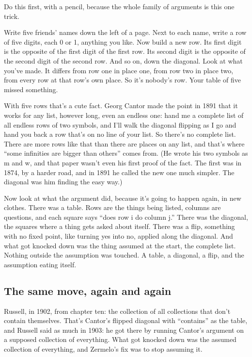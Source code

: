 \documentclass[11pt,twoside]{article}
\theoremstyle{thielethm}
\theoremstyle{thieledef}
\theoremstyle{thieledef}
\theoremstyle{thieledef}
\theoremstyle{thielethm}
\theoremstyle{thieleobs}
\theoremstyle{thielethm}
\begin{document}
Do this first, with a pencil, because the whole family of arguments is this one trick.

Write five friends' names down the left of a page. Next to each name, write a row of five digits, each 0 or 1, anything you like. Now build a new row. Its first digit is the opposite of the first digit of the first row. Its second digit is the opposite of the second digit of the second row. And so on, down the diagonal. Look at what you've made. It differs from row one in place one, from row two in place two, from every row at that row's own place. So it's nobody's row. Your table of five missed something.

With five rows that's a cute fact. Georg Cantor made the point in 1891 that it works for any list, however long, even an endless one: hand me a complete list of all endless rows of two symbols, and I'll walk the diagonal flipping as I go and hand you back a row that's on no line of your list. So there's no complete list. There are more rows like that than there are places on any list, and that's where ``some infinities are bigger than others'' comes from. (He wrote his two symbols as m and w, and that paper wasn't even his first proof of the fact. The first was in 1874, by a harder road, and in 1891 he called the new one much simpler. The diagonal was him finding the easy way.)

Now look at what the argument did, because it's going to happen again, in new clothes. There was a table. Rows are the things being listed, columns are questions, and each square says ``does row i do column j.'' There was the diagonal, the squares where a thing gets asked about itself. There was a flip, something with no fixed point, like turning yes into no, applied along the diagonal. And what got knocked down was the thing assumed at the start, the complete list. Nothing outside the assumption was touched. A table, a diagonal, a flip, and the assumption eating itself.

\subsection{The same move, again and again}

Russell, in 1902, from chapter ten: the collection of all collections that don't contain themselves. That's Cantor's flipped diagonal with ``contains'' as the table, and Russell said as much in 1903: he got there by running Cantor's argument on a supposed collection of everything. What got knocked down was the assumed collection of everything, and Zermelo's fix was to stop assuming it.
\end{document}
